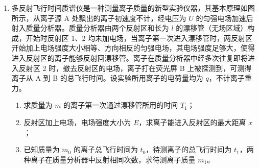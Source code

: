 \documentclass[\gkver]{gaokaozhenti}
\begin{document}
\begin{enumerate}
\item
多反射飞行时间质谱仪是一种测量离子质量的新型实验仪器，其基本原理如图所示，从离子源 A 处飘出的离子初速度不计，经电压为 $U$ 的匀强电场加速后射入质量分析器。质量分析器由两个反射区和长为 $l$ 的漂移管（无场区域）构成，开始时反射区 1、2 均未加电场，当离子第一次进入漂移管时，两反射区开始加上电场强度大小相等、方向相反的匀强电场，其电场强度足够大，使得进入反射区的离子能够反射回漂移管。离子在质量分析器中经多次往复即将进入反射区 2 时，撤去反射区的电场，离子打在荧光屏 B 上被探测到，可测得离子从 A 到 B 的总飞行时间。设实验所用离子的电荷量均为 $q$，不计离子重力。
\begin{enumerate}
	\item
	求质量为 $m$ 的离子第一次通过漂移管所用的时间 $T_{1}$；
	\item
	反射区加上电场，电场强度大小为 $E$，求离子能进入反射区的最大距离 $x$；
	\item
	已知质量为 $m_{0}$ 的离子总飞行时间为 $t_{0}$，待测离子的总飞行时间为 $t_{1}$，两种离子在质量分析器中反射相同次数，求待测离子质量 $m_{1}$。
\end{enumerate}
\end{enumerate}
\end{document}
